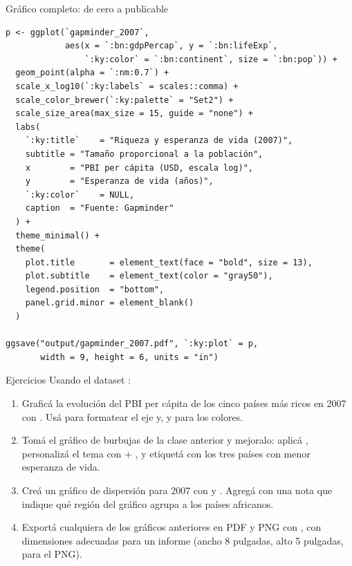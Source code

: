 \documentclass[8pt]{beamer}
\begin{document}
	\begin{frame}[fragile]{Gráfico completo: de cero a publicable}

\begin{lstlisting}[style=RScript]
p <- ggplot(`gapminder_2007`,
            aes(x = `:bn:gdpPercap`, y = `:bn:lifeExp`,
                `:ky:color` = `:bn:continent`, size = `:bn:pop`)) +
  geom_point(alpha = `:nm:0.7`) +
  scale_x_log10(`:ky:labels` = scales::comma) +
  scale_color_brewer(`:ky:palette` = "Set2") +
  scale_size_area(max_size = 15, guide = "none") +
  labs(
    `:ky:title`    = "Riqueza y esperanza de vida (2007)",
    subtitle = "Tamaño proporcional a la población",
    x        = "PBI per cápita (USD, escala log)",
    y        = "Esperanza de vida (años)",
    `:ky:color`    = NULL,
    caption  = "Fuente: Gapminder"
  ) +
  theme_minimal() +
  theme(
    plot.title       = element_text(face = "bold", size = 13),
    plot.subtitle    = element_text(color = "gray50"),
    legend.position  = "bottom",
    panel.grid.minor = element_blank()
  )

ggsave("output/gapminder_2007.pdf", `:ky:plot` = p,
       width = 9, height = 6, units = "in")
\end{lstlisting}
	\end{frame}


	\begin{frame}[fragile]{Ejercicios}
		Usando el dataset :

		\begin{enumerate}
			\item Graficá la evolución del PBI per cápita de los cinco países más ricos en 2007 con . Usá  para formatear el eje y, y  para los colores.

			\item Tomá el gráfico de burbujas de la clase anterior y mejoralo: aplicá , personalizá el tema con  + , y etiquetá con  los tres países con menor esperanza de vida.

			\item Creá un gráfico de dispersión para 2007 con  y . Agregá con  una nota que indique qué región del gráfico agrupa a los países africanos.

			\item Exportá cualquiera de los gráficos anteriores en PDF y PNG con , con dimensiones adecuadas para un informe (ancho 8 pulgadas, alto 5 pulgadas,  para el PNG).
		\end{enumerate}
	\end{frame}
\end{document}
